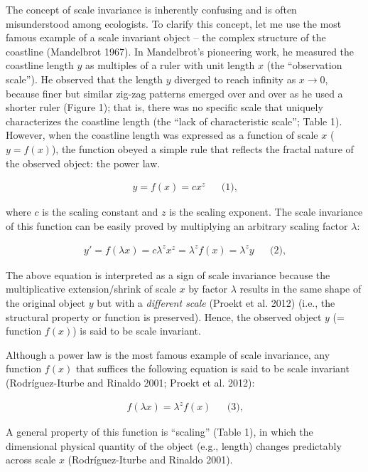 \documentclass[
  12pt,
]{article}
\begin{document}
The concept of scale invariance is inherently confusing and is often misunderstood among ecologists. To clarify this concept, let me use the most famous example of a scale invariant object -- the complex structure of the coastline (Mandelbrot 1967). In Mandelbrot's pioneering work, he measured the coastline length \(y\) as multiples of a ruler with unit length \(x\) (the ``observation scale''). He observed that the length \(y\) diverged to reach infinity as \(x \rightarrow 0\), because finer but similar zig-zag patterns emerged over and over as he used a shorter ruler (Figure 1); that is, there was no specific scale that uniquely characterizes the coastline length (the ``lack of characteristic scale''; Table 1). However, when the coastline length was expressed as a function of scale \(x\) (\(y = f(x)\)), the function obeyed a simple rule that reflects the fractal nature of the observed object: the power law.

\[
\begin{aligned}
y = f(x) = cx^z &&\text{(1),}
\end{aligned}
\]

where \(c\) is the scaling constant and \(z\) is the scaling exponent. The scale invariance of this function can be easily proved by multiplying an arbitrary scaling factor \(\lambda\):

\[
\begin{aligned}
y'=f(\lambda x)=c\lambda^zx^z = \lambda^z f(x) = \lambda^z y  &&\text{(2),}
\end{aligned}
\]

The above equation is interpreted as a sign of scale invariance because the multiplicative extension/shrink of scale \(x\) by factor \(\lambda\) results in the same shape of the original object \(y\) but with a \emph{different scale} (Proekt et al. 2012) (i.e., the structural property or function is preserved). Hence, the observed object \(y\) (= function \(f(x)\)) is said to be scale invariant.

Although a power law is the most famous example of scale invariance, any function \(f(x)\) that suffices the following equation is said to be scale invariant (Rodríguez-Iturbe and Rinaldo 2001; Proekt et al. 2012):

\[
\begin{aligned}
f(\lambda x) = \lambda^z f(x) &&\text{(3),}
\end{aligned}
\]

A general property of this function is ``scaling'' (Table 1), in which the dimensional physical quantity of the object (e.g., length) changes predictably across scale \(x\) (Rodríguez-Iturbe and Rinaldo 2001).
\end{document}
